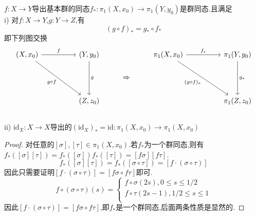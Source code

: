 \documentclass{article}
\begin{document}
\begin{lemma}
    $f : X \to Y$导出基本群的同态$f_*:\pi_1(X,x_0) \to \pi_1(Y,y_0)$是群同态.且满足\\
    i) 对$f : X \to Y$,$g : Y \to Z$,有
    $$
    (g \circ f)_* = g_* \circ f_*
    $$
    即下列图交换
    \[\begin{tikzcd}
        {(X,x_0)} && {(Y,y_0)} && {\pi_1(X,x_0)} && {\pi_1(Y,y_0)} \\
        &&& \Rightarrow \\
        && {(Z,z_0)} &&&& {\pi_1(Z,z_0)}
        \arrow["{f_*}", from=1-5, to=1-7]
        \arrow["{g_*}", from=1-7, to=3-7]
        \arrow["{(g \circ f)_*}"', from=1-5, to=3-7]
        \arrow["f", from=1-1, to=1-3]
        \arrow["g", from=1-3, to=3-3]
        \arrow["{g \circ f}"', from=1-1, to=3-3]
    \end{tikzcd}\]\\
    ii) $\text{id}_X : X \to X$导出的$(\text{id}_X)_* = \text{id} : \pi_1(X,x_0) \to \pi_1(X,x_0)$
\end{lemma}
\begin{proof}
    对任意的$[\sigma],[\tau]\in \pi_1(X,x_0)$.若$f_*$为一个群同态,则有$f_*([\sigma][\tau]) = f_*([\sigma])f_*([\tau]) = [f\sigma][f\tau]$.\\
    $$
    f_*([\sigma][\tau]) = f_*([\sigma\circ \tau]) = [f\cdot(\sigma\circ\tau)]
    $$
    因此只需要证明$[f\cdot(\sigma \circ \tau)] = [f\sigma \circ f\tau]$即可.
    $$
    f\circ(\sigma \circ \tau)(s) = \left\{
        \begin{array}{c}
            f \circ \sigma(2s),0\leq s \leq 1/2\\
            f \circ \tau(2s - 1), 1/2 \leq s \leq 1\\
        \end{array}
    \right.
    $$
    因此$[f\cdot(\sigma \circ \tau)] = [f\sigma \circ f \tau]$,即$f_*$是一个群同态,后面两条性质是显然的.
\end{proof}
\end{document}
